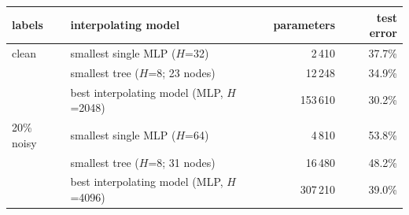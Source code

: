 \begin{tabular}{@{}llrr@{}}\toprule
labels & interpolating model & parameters & test error\\\midrule
clean & smallest single MLP ($H$=32) & 2\,410 & 37.7\%\\
 & smallest tree ($H$=8; 23 nodes) & 12\,248 & 34.9\%\\
 & best interpolating model (MLP, $H$=2048) & 153\,610 & 30.2\%\\
\midrule
20\% noisy & smallest single MLP ($H$=64) & 4\,810 & 53.8\%\\
 & smallest tree ($H$=8; 31 nodes) & 16\,480 & 48.2\%\\
 & best interpolating model (MLP, $H$=4096) & 307\,210 & 39.0\%\\
\bottomrule\end{tabular}
